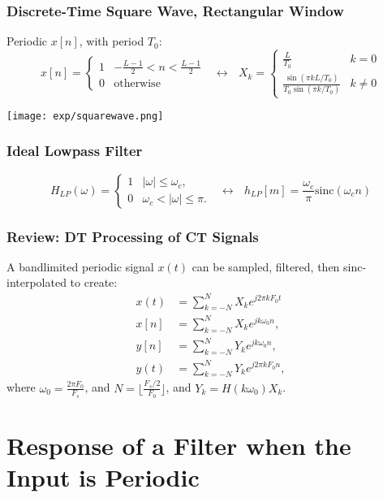 \documentclass{beamer}
\begin{document}
\begin{frame}
  \frametitle{Discrete-Time Square Wave, Rectangular Window}

  Periodic $x[n]$, with period $T_0$:
  \begin{displaymath}
    x[n] = \begin{cases}1&-\frac{L-1}{2}< n<\frac{L-1}{2}\\
      0&\text{otherwise}
    \end{cases}~~~\leftrightarrow~~~
    X_k= \begin{cases}
      \frac{L}{T_0} & k=0\\
      \frac{\sin(\pi kL/T_0)}{T_0\sin(\pi k/T_0)} & k\ne 0
    \end{cases}
  \end{displaymath}
  \centerline{\texttt{[image: exp/squarewave.png]}}
\end{frame}

\begin{frame}
  \frametitle{Ideal Lowpass Filter}
  \[
  H_{LP}(\omega)
  = \begin{cases} 1& |\omega|\le\omega_c,\\
    0 & \omega_c<|\omega|\le\pi.
  \end{cases}~~~\leftrightarrow~~~
  h_{LP}[m]=\frac{\omega_c}{\pi}\mbox{sinc}(\omega_c n)
  \]
\end{frame}

\begin{frame}
  \frametitle{Review: DT Processing of CT Signals}

  A bandlimited periodic signal $x(t)$ can be sampled, filtered, then
  sinc-interpolated to create:
  \begin{align*}
    x(t)&=\sum_{k=-N}^{N}X_ke^{j2\pi kF_0t}\\
    x[n]&=\sum_{k=-N}^{N}X_ke^{jk\omega_0n},\\
    y[n]&=\sum_{k=-N}^{N}Y_ke^{jk\omega_0n},\\
    y(t)&=\sum_{k=-N}^{N}Y_ke^{j2\pi kF_0n},
  \end{align*}
  where $\omega_0=\frac{2\pi F_0}{F_s}$, and
  $N=\lfloor\frac{F_s/2}{F_0}\rfloor$, and $Y_k=H(k\omega_0)X_k$.
\end{frame}


\section[Periodic Signals]{Response of a Filter when the  Input is Periodic}
\setcounter{subsection}{1}
\end{document}
